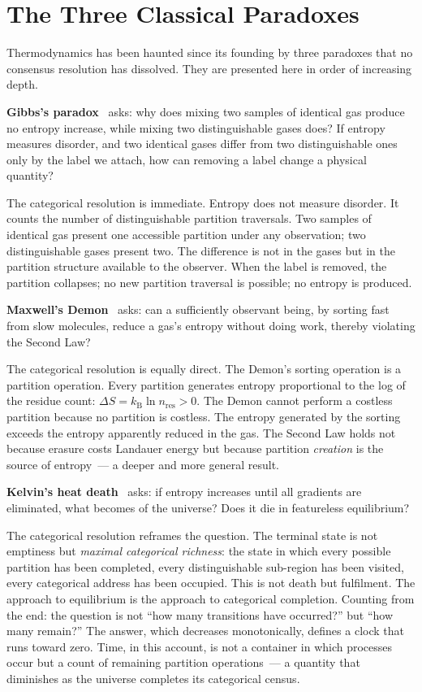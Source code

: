 \section*{The Three Classical Paradoxes}

Thermodynamics has been haunted since its founding by three paradoxes that no
consensus resolution has dissolved. They are presented here in order of increasing
depth.

\textbf{Gibbs's paradox}~\cite{gibbs1876} asks: why does mixing two samples of
identical gas produce no entropy increase, while mixing two distinguishable gases does? If entropy measures
disorder, and two identical gases differ from two distinguishable ones only by the
label we attach, how can removing a label change a physical quantity?

The categorical resolution is immediate. Entropy does not measure disorder.
It counts the number of distinguishable partition traversals. Two samples of identical
gas present one accessible partition under any observation; two distinguishable gases
present two. The difference is not in the gases but in the partition structure available
to the observer. When the label is removed, the partition collapses; no new partition
traversal is possible; no entropy is produced.

\textbf{Maxwell's Demon}~\cite{maxwell1871theory,szilard1929} asks: can a sufficiently
observant being, by sorting fast from slow molecules, reduce a gas's entropy without
doing work, thereby violating the Second Law?

The categorical resolution is equally direct. The Demon's sorting operation is a
partition operation. Every partition generates entropy proportional to the log of the
residue count: $\Delta S = k_{\mathrm{B}} \ln n_{\text{res}} > 0$. The Demon cannot
perform a costless partition because no partition is costless. The entropy generated
by the sorting exceeds the entropy apparently reduced in the gas. The Second Law holds
not because erasure costs Landauer energy but because partition \emph{creation} is
the source of entropy~--- a deeper and more general result.

\textbf{Kelvin's heat death}~\cite{kelvin1852,helmholtz1854} asks: if entropy
increases until all gradients are eliminated, what becomes of the universe? Does it die in featureless equilibrium?

The categorical resolution reframes the question. The terminal state is not emptiness
but \emph{maximal categorical richness}: the state in which every possible partition
has been completed, every distinguishable sub-region has been visited, every
categorical address has been occupied. This is not death but fulfilment. The approach
to equilibrium is the approach to categorical completion. Counting from the end:
the question is not ``how many transitions have occurred?'' but ``how many remain?''
The answer, which decreases monotonically, defines a clock that runs toward zero.
Time, in this account, is not a container in which processes occur but a count of
remaining partition operations~--- a quantity that diminishes as the universe completes
its categorical census.


